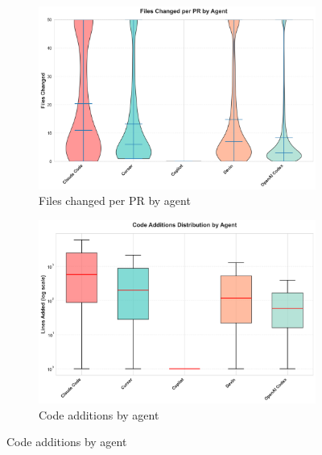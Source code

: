 \documentclass[11pt]{article}
\begin{document}
\begin{figure}[H]
\centering
\begin{subfigure}[b]{0.48\textwidth}
\centering
\includegraphics[width=\textwidth]{figures_individual/31_entity_files_changed_by_agent.png}
\caption{Files changed per PR by agent}
\label{fig:entity_files}
\end{subfigure}
\hfill
\begin{subfigure}[b]{0.48\textwidth}
\centering
\includegraphics[width=\textwidth]{figures_individual/32_entity_lines_added_by_agent.png}
\caption{Code additions by agent}
\label{fig:entity_additions}
\end{subfigure}

\vspace{0.2cm}


\end{figure}
\end{document}
